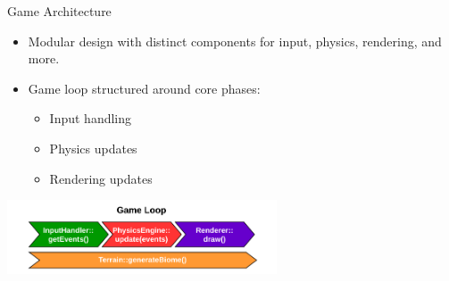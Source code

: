 
\begin{frame}{Game Architecture}
    \begin{itemize}
        \item Modular design with distinct components for input, physics, rendering, and more.
        \item Game loop structured around core phases:
        \begin{itemize}
            \item Input handling
            \item Physics updates
            \item Rendering updates
        \end{itemize}
    \end{itemize}
    \centering
    \includegraphics[width=0.6\textwidth]{../figures/physics/gameLoop.pdf} %
\end{frame}